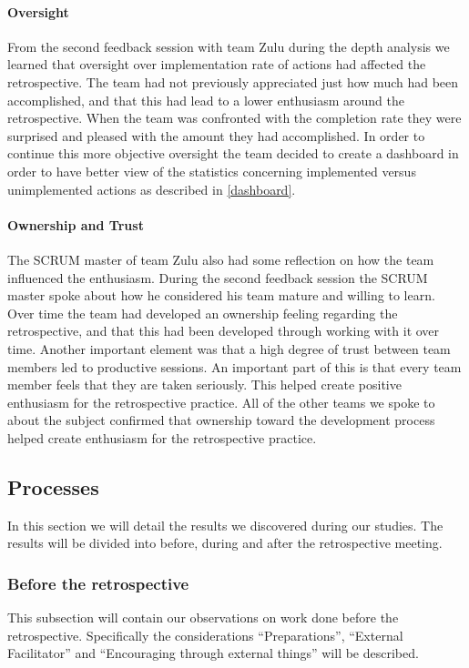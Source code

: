 \paragraph{Oversight}
From the second feedback session with team Zulu during the depth analysis we learned that oversight over implementation rate of actions had affected the retrospective. The team had not previously appreciated just how much had been accomplished, and that this had lead to a lower enthusiasm around the retrospective. When the team was confronted with the completion rate they were surprised and pleased with the amount they had accomplished. In order to continue this more objective oversight the team decided to create a dashboard in order to have better view of the statistics concerning implemented versus unimplemented actions as described in \autoref{dashboard}. 

\paragraph{Ownership and Trust}
The SCRUM master of team Zulu also had some reflection on how the team influenced the enthusiasm. During the second feedback session the SCRUM master spoke about how he considered his team mature and willing to learn. Over time the team had developed an ownership feeling regarding the retrospective, and that this had been developed through working with it over time. Another important element was that a high degree of trust between team members led to productive sessions. An important part of this is that every team member feels that they are taken seriously. This helped create positive enthusiasm for the retrospective practice. All of the other teams we spoke to about the subject confirmed that ownership toward the development process helped create enthusiasm for the retrospective practice. 

\subsection{Processes}
In this section we will detail the results we discovered during our studies. The results will be divided into before, during and after the retrospective meeting.

\subsubsection{Before the retrospective}
This subsection will contain our observations on work done before the retrospective. Specifically the considerations ``Preparations'', ``External Facilitator'' and ``Encouraging through external things'' will be described.

